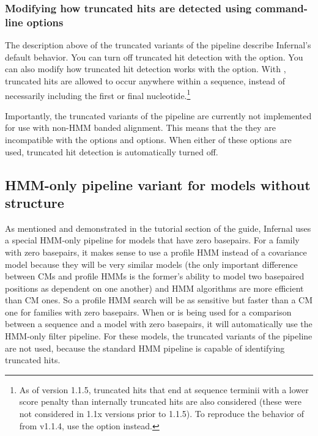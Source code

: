 
\subsubsection{Modifying how truncated hits are detected using
  command-line options}

The description above of the truncated variants of the pipeline
describe Infernal's default behavior. You can turn off truncated hit
detection with the  option. You can also modify how
truncated hit detection works with the  option. With
, truncated hits are allowed to occur anywhere
within a sequence, instead of necessarily including the first or final
nucleotide.\footnote{As of version 1.1.5, truncated hits that end at
  sequence terminii with a lower score penalty than internally
  truncated hits are also considered (these were not considered in
  1.1x versions prior to 1.1.5).  To reproduce the behavior of
   from v1.1.4, use the  option
  instead.}

Importantly, the truncated variants of the pipeline are currently not
implemented for use with non-HMM banded alignment. This means that the
they are incompatible with the  options and
 options. When either of these options are used,
truncated hit detection is automatically turned off.

\subsection{HMM-only pipeline variant for models without structure}

As mentioned and demonstrated in the tutorial section of the guide,
Infernal uses a special HMM-only pipeline for models that have zero
basepairs. For a family with zero basepairs, it makes sense to use a
profile HMM instead of a covariance model because they will be very
similar models (the only important difference between CMs and profile
HMMs is the former's ability to model two basepaired positions as
dependent on one another) and HMM algorithms are more efficient than
CM ones. So a profile HMM search will be as sensitive but faster than
a CM one for families with zero basepairs.  When  or
 is being used for a comparison between a sequence and a
model with zero basepairs, it will automatically use the HMM-only
filter pipeline. For these models, the truncated variants of the
pipeline are not used, because the standard HMM pipeline is capable of
identifying truncated hits.

